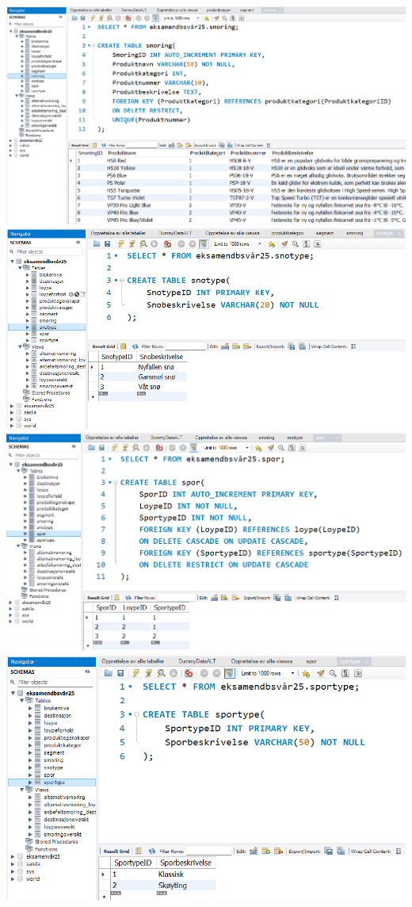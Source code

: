 \documentclass[12pt, a4paper]{article}
\begin{document}
\includegraphics[width=\textwidth]{smoring.png}
\includegraphics[width=\textwidth]{snotype.png}
\includegraphics[width=\textwidth]{spor.png}
\includegraphics[width=\textwidth]{sportype.png}
\end{document}
